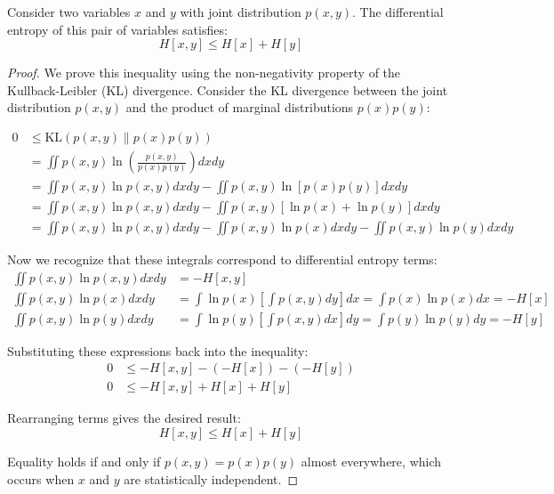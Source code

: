 \documentclass[../main.tex]{subfiles}
\begin{document}
\begin{yellow}
\begin{theorem}

Consider two variables $x$ and $y$ with joint distribution $p(x,y)$. The differential entropy of this pair of variables satisfies:
\begin{equation*}
H[x,y] \leq H[x] + H[y]
\end{equation*}


\end{theorem}
\end{yellow}
\begin{proof}
We prove this inequality using the non-negativity property of the Kullback-Leibler (KL) divergence. Consider the KL divergence between the joint distribution $p(x,y)$ and the product of marginal distributions $p(x)p(y)$:

\begin{align*}
0 &\leq \text{KL}(p(x,y) \| p(x)p(y)) \\
&= \iint p(x,y) \ln \left( \frac{p(x,y)}{p(x)p(y)} \right) dxdy \\
&= \iint p(x,y) \ln p(x,y) dxdy - \iint p(x,y) \ln [p(x)p(y)] dxdy \\
&= \iint p(x,y) \ln p(x,y) dxdy - \iint p(x,y) [\ln p(x) + \ln p(y)] dxdy \\
&= \iint p(x,y) \ln p(x,y) dxdy - \iint p(x,y) \ln p(x) dxdy - \iint p(x,y) \ln p(y) dxdy
\end{align*}

Now we recognize that these integrals correspond to differential entropy terms:
\begin{align*}
\iint p(x,y) \ln p(x,y) dxdy &= -H[x,y] \\
\iint p(x,y) \ln p(x) dxdy &= \int \ln p(x) \left[ \int p(x,y) dy \right] dx = \int p(x) \ln p(x) dx = -H[x] \\
\iint p(x,y) \ln p(y) dxdy &= \int \ln p(y) \left[ \int p(x,y) dx \right] dy = \int p(y) \ln p(y) dy = -H[y]
\end{align*}

Substituting these expressions back into the inequality:
\begin{align*}
0 &\leq -H[x,y] - (-H[x]) - (-H[y]) \\
0 &\leq -H[x,y] + H[x] + H[y]
\end{align*}

Rearranging terms gives the desired result:
\begin{equation*}
H[x,y] \leq H[x] + H[y]
\end{equation*}

Equality holds if and only if $p(x,y) = p(x)p(y)$ almost everywhere, which occurs when $x$ and $y$ are statistically independent.
\end{proof}
    
\end{document}
